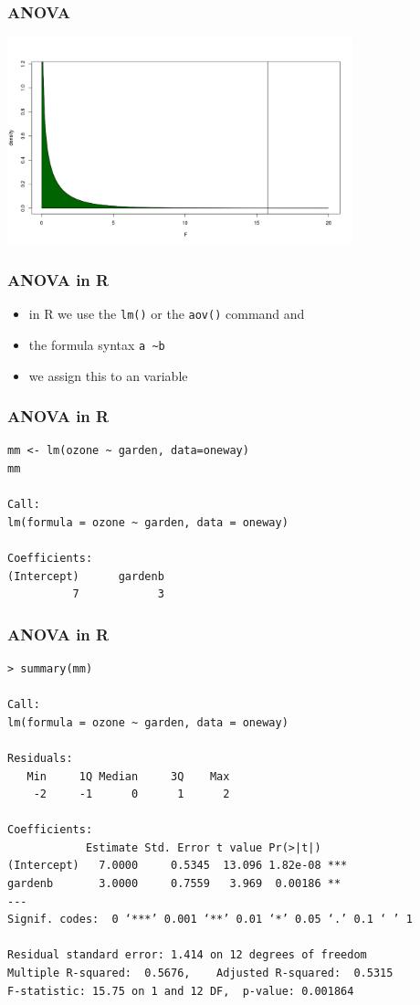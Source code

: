 \begin{frame}\frametitle{ANOVA}
\begin{center}
\includegraphics[width=10cm]{img/fdens.png}
\end{center}
\end{frame}


\begin{frame}[fragile]\frametitle{ANOVA in R}
  \begin{itemize}
  \item in R we use the \texttt{lm()} or the \texttt{aov()} command and
  \item the formula syntax \texttt{a \sim  b}
  \item we assign this to an variable
 \end{itemize}
\end{frame}


\begin{frame}[fragile]\frametitle{ANOVA in R}
\begin{verbatim}
mm <- lm(ozone ~ garden, data=oneway)
mm

Call:
lm(formula = ozone ~ garden, data = oneway)

Coefficients:
(Intercept)      gardenb  
          7            3  
\end{verbatim}
\end{frame}


\begin{frame}[fragile]\frametitle{ANOVA in R}
\footnotesize
\begin{verbatim}
> summary(mm)

Call:
lm(formula = ozone ~ garden, data = oneway)

Residuals:
   Min     1Q Median     3Q    Max 
    -2     -1      0      1      2 

Coefficients:
            Estimate Std. Error t value Pr(>|t|)    
(Intercept)   7.0000     0.5345  13.096 1.82e-08 ***
gardenb       3.0000     0.7559   3.969  0.00186 ** 
---
Signif. codes:  0 ‘***’ 0.001 ‘**’ 0.01 ‘*’ 0.05 ‘.’ 0.1 ‘ ’ 1

Residual standard error: 1.414 on 12 degrees of freedom
Multiple R-squared:  0.5676,	Adjusted R-squared:  0.5315 
F-statistic: 15.75 on 1 and 12 DF,  p-value: 0.001864
\end{verbatim}
\end{frame}

